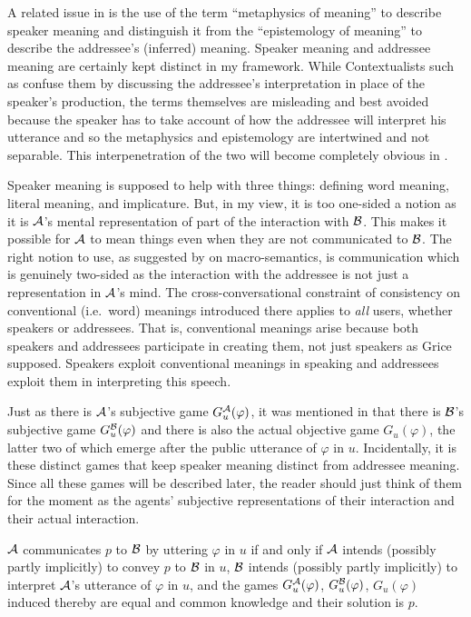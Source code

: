 A related issue in \citet{devitt:mflp}  is the use of the term ``metaphysics of meaning'' to describe speaker meaning and distinguish it from the ``epistemology of meaning'' to describe the addressee's (inferred) meaning. Speaker meaning and addressee meaning are certainly kept distinct in my framework. While Contextualists such as \citet{recanati:lm} confuse them by discussing the addressee's interpretation in place of the speaker's production, the terms themselves are misleading and best avoided because the speaker has to take account of how the addressee will interpret his utterance and so the metaphysics and epistemology are intertwined and not separable. This interpenetration of the two will become completely obvious in .

Speaker meaning is supposed to help with three things: defining word meaning, literal meaning, and implicature. But, in my view, it is too one-sided a notion as it is $\cal A$'s mental representation of part of the interaction with $\cal B$. This makes it possible for $\cal A$ to mean things even when they are not communicated to $\cal B$. The right notion to use, as suggested by  on macro-semantics, is communication which is genuinely two-sided as the interaction with the addressee is not just a representation in $\cal A$'s mind. The cross-conversational constraint of consistency on conventional (i.e.\ word) meanings introduced there applies to \emph{all} users, whether speakers or addressees. That is, conventional meanings arise because both speakers and addressees participate in creating them, not just speakers as Grice supposed. Speakers exploit conventional meanings in speaking and addressees exploit them in interpreting this speech.

Just as there is $\cal A$'s subjective game $G^{\cal A}_u(\varphi)$, it was mentioned in  that there is $\cal B$'s subjective game $G^{\cal B}_u(\varphi)$ and there is also the actual objective game $G_u(\varphi)$, the latter two of which emerge after the public utterance of $\varphi$ in $u$. Incidentally, it is these distinct games that keep speaker meaning distinct from addressee meaning. Since all these games will be described later, the reader should just think of them for the moment as the agents' subjective representations of their interaction and their actual interaction.

\begin{definition}

$\cal A$ communicates $p$ to $\cal B$ by uttering $\varphi$ in $u$ if and only if $\cal A$ intends (possibly partly implicitly) to convey $p$ to $\cal B$ in $u$, $\cal B$ intends (possibly partly implicitly) to interpret $\cal A$'s utterance of 
$\varphi$ in $u$, and the games $G^{\cal A}_u(\varphi)$, $G^{\cal B}_u(\varphi)$, $G_u(\varphi)$ induced thereby are equal and common knowledge and their solution is $p$.
\label{def:communicates}
\end{definition}


